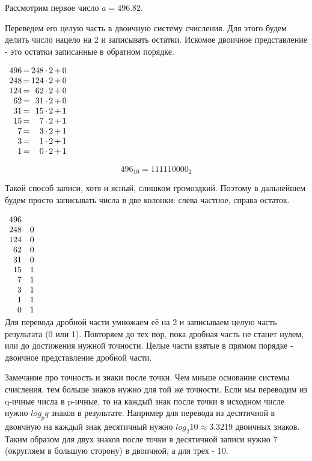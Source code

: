 \documentclass[a4paper,12pt]{article}
\begin{document}
Рассмотрим первое число $a = 496.82$.

Переведем его целую часть в двоичную систему счисления.
Для этого будем делить число нацело на 2 и записывать остатки.
Искомое двоичное представление - это остатки записанные в обратном порядке.

$\begin{array}{r @{\, = \,}r@{\, \cdot \, 2 \, + \,}l}
496 & 248 & 0 \\
248 & 124 & 0 \\
124 & 62 & 0 \\
62 & 31 & 0 \\
31 & 15 & 1 \\
15 & 7 & 1 \\
7 & 3 & 1 \\
3 & 1 & 1 \\
1 & 0 & 1 \\
\end{array}$

\[496_{10} = 111110000_2\]

Такой способ записи, хотя и ясный, слишком громоздкий.
Поэтому в дальнейшем будем просто записывать числа в две колонки: слева частное, справа остаток.

$\begin{array}{r l}
496 \\
248 & 0 \\
124 & 0 \\
62 & 0 \\
31 & 0 \\
15 & 1 \\
7 & 1 \\
3 & 1 \\
1 & 1 \\
0 & 1 \\
\end{array}$
\\

Для перевода дробной части умножаем её на 2 и записываем целую часть результата (0 или 1).
Повторяем до тех пор, пока дробная часть не станет нулем, или до достижения нужной точности.
Целые части взятые в прямом порядке - двоичное представление дробной части.

Замечание про точность и знаки после точки.
Чем мньше основание системы счисления, тем больше знаков нужно для той же точности.
Если мы переводим из q-ичные числа в p-ичные, то на каждый знак после точки в исходном числе нужно $log_p q$ знаков в результате.
Например для перевода из десятичной в двоичную на каждый знак десятичный нужно $log_2 10 \approx 3.3219$ двоичных знаков.
Таким образом для двух знаков после точки в десятичной записи нужно 7 (округляем в большую сторону) в двоичной, а для трех - 10.
\end{document}
